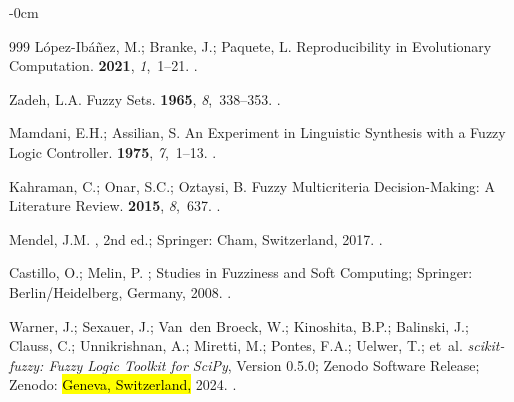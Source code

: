 \documentclass[systems,article,accept,moreauthors,pdftex]{Definitions/mdpi}
\begin{document}
\begin{adjustwidth}{-\extralength}{0cm}
\begin{thebibliography}{999}
L{\'o}pez-Ib{\'a}{\~n}ez, M.; Branke, J.; Paquete, L.
\newblock Reproducibility in Evolutionary Computation.
 {\bf
  2021}, {\em 1},~1--21.
.

Zadeh, L.A.
\newblock Fuzzy Sets.
 {\bf 1965}, {\em 8},~338--353.
.

Mamdani, E.H.; Assilian, S.
\newblock An Experiment in Linguistic Synthesis with a Fuzzy Logic Controller.
 {\bf 1975}, {\em
  7},~1--13.
.

Kahraman, C.; Onar, S.C.; Oztaysi, B.
\newblock Fuzzy Multicriteria Decision-Making: A Literature Review.
  {\bf 2015}, {\em 8},~637.
.

Mendel, J.M.
, 2nd ed.; Springer: Cham, Switzerland,  2017.
.

Castillo, O.; Melin, P.
; Studies in
  Fuzziness and Soft Computing; Springer: Berlin/Heidelberg, Germany,  2008.
.

Warner, J.; Sexauer, J.; Van~den Broeck, W.; Kinoshita, B.P.;  Balinski, J.;  Clauss, C.;  Unnikrishnan, A.; Miretti, M.; Pontes, F.A.;  Uelwer, T.; et~al.
\newblock \emph{{scikit-fuzzy}: Fuzzy Logic Toolkit for {SciPy}}, Version 0.5.0;
\newblock Zenodo Software Release; Zenodo: \hl{Geneva, Switzerland,} %
  2024.
.


\end{thebibliography}
\end{adjustwidth}
\end{document}
